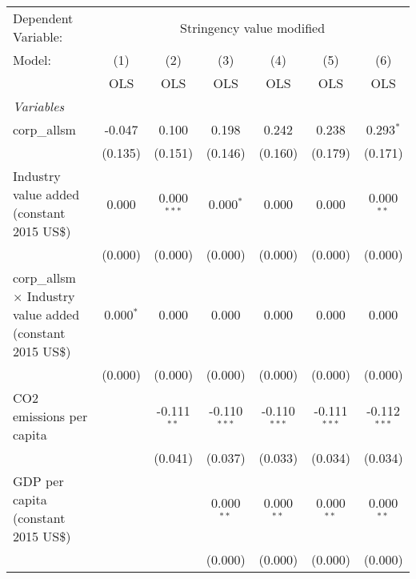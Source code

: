 
\begingroup
\centering
\begin{tabular}{lcccccc}
   \toprule
   Dependent Variable: & \multicolumn{6}{c}{Stringency value modified}\\
   Model:                                                            & (1)         & (2)           & (3)            & (4)            & (5)            & (6)\\  
                                                                     &  OLS        & OLS           & OLS            & OLS            & OLS            & OLS\\  
   \midrule
   \emph{Variables}\\
   corp\_allsm                                                       & -0.047      & 0.100         & 0.198          & 0.242          & 0.238          & 0.293$^{*}$\\   
                                                                     & (0.135)     & (0.151)       & (0.146)        & (0.160)        & (0.179)        & (0.171)\\   
   Industry value added (constant 2015 US\$)                         & 0.000       & 0.000$^{***}$ & 0.000$^{*}$    & 0.000          & 0.000          & 0.000$^{**}$\\   
                                                                     & (0.000)     & (0.000)       & (0.000)        & (0.000)        & (0.000)        & (0.000)\\   
   corp\_allsm $\times$ Industry value added (constant 2015 US\$)    & 0.000$^{*}$ & 0.000         & 0.000          & 0.000          & 0.000          & 0.000\\   
                                                                     & (0.000)     & (0.000)       & (0.000)        & (0.000)        & (0.000)        & (0.000)\\   
   CO2 emissions per capita                                          &             & -0.111$^{**}$ & -0.110$^{***}$ & -0.110$^{***}$ & -0.111$^{***}$ & -0.112$^{***}$\\   
                                                                     &             & (0.041)       & (0.037)        & (0.033)        & (0.034)        & (0.034)\\   
   GDP per capita (constant 2015 US\$)                               &             &               & 0.000$^{**}$   & 0.000$^{**}$   & 0.000$^{**}$   & 0.000$^{**}$\\   
                                                                     &             &               & (0.000)        & (0.000)        & (0.000)        & (0.000)\\   

\end{tabular}
